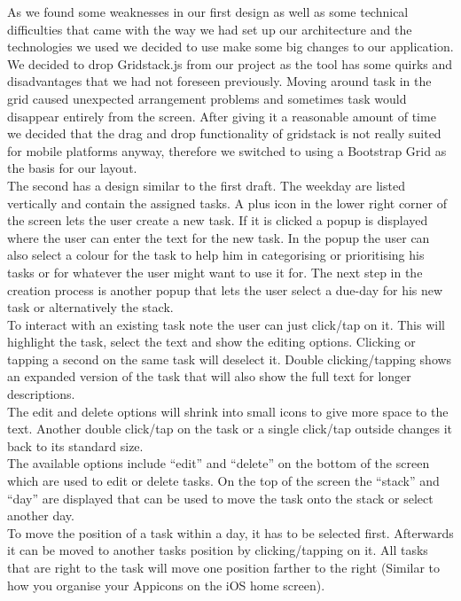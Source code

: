 As we found some weaknesses in our first design as well as some technical difficulties that came with the way we had set up our architecture and the technologies we used we decided to use make some big changes to our application. 
We decided to drop Gridstack.js from our project as the tool has some quirks and disadvantages that we had not foreseen previously.  
Moving around task in the grid caused unexpected arrangement problems and sometimes task would disappear entirely from the screen. 
After giving it a reasonable amount of time we decided that the drag and drop functionality of gridstack is not really suited for mobile platforms anyway, 
therefore we switched to using a Bootstrap Grid as the basis for our layout. \\
The second has a design similar to the first draft. 
The weekday are listed vertically and contain the assigned tasks. 
A plus icon in the lower right corner of the screen lets the user create a new task. 
If it is clicked a popup is displayed where the user can enter the text for the new task. 
In the popup the user can also select a colour for the task to help him in categorising or prioritising his tasks or for whatever the user might want to use it for. 
The next step in the creation process is another popup that lets the user select a due-day for his new task or alternatively the stack. \\
To interact with an existing task note the user can just click/tap on it. 
This will highlight the task, select the text and show the editing options. 
Clicking or tapping a second on the same task will deselect it. 
Double clicking/tapping shows an expanded version of the task that will also show the full text for longer descriptions. \\
The edit and delete options will shrink into small icons to give more space to the text. 
Another double click/tap on the task or a single click/tap outside changes it back to its standard size. \\
The available options include “edit” and “delete” on the bottom of the screen which are used to edit or delete tasks. 
On the top of the screen the “stack” and “day” are displayed that can be used to move the task onto the stack or select another day. \\
To move the position of a task within a day, it has to be selected first. Afterwards it can be moved to another tasks position by clicking/tapping on it. 
All tasks that are right to the task will move one position farther to the right (Similar to how you organise your Appicons on the iOS home screen). 
